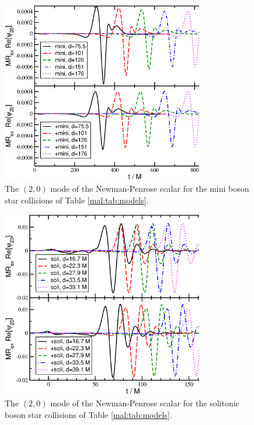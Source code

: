 %
%
\begin{figure}
    \centering
    \includegraphics[width=250pt]{malaise_source/mini_psi20.eps}
    \caption{The $(2,0)$ mode of the Newman-Penrose scalar
    for the mini boson star collisions of Table \ref{mal:tab:models}.
    }
    \label{mal:fig:mini_psi20}
\end{figure}
%
%
\begin{figure}
    \centering
    \includegraphics[width=250pt]{malaise_source/soli_psi20.eps}
    \caption{The $(2,0)$ mode of the Newman-Penrose scalar
    for the solitonic boson star collisions of Table \ref{mal:tab:models}.
    }
    \label{mal:fig:soli_psi20}
\end{figure}
%

